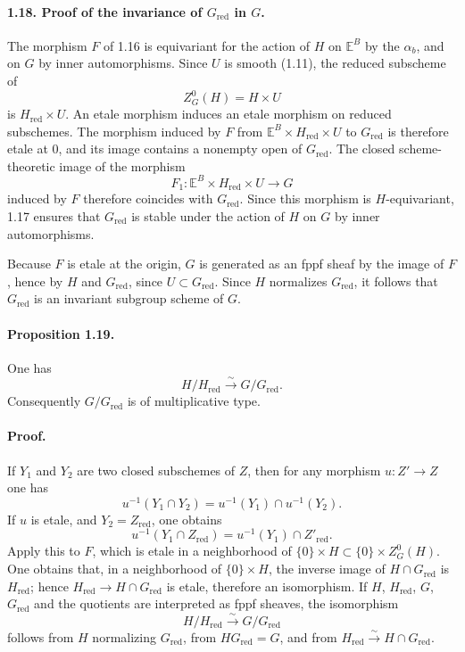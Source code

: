 \documentclass[11pt]{article}
\newcommand{\red}{\mathrm{red}}
\newcommand{\xiso}{\xrightarrow{\sim}}
\theoremstyle{plain}
\theoremstyle{definition}
\begin{document}
\paragraph{1.18. Proof of the invariance of $G_{\red}$ in $G$.} The morphism $F$ of 1.16 is equivariant for the action of $H$ on $\mathbb E^B$ by the $\alpha_b$, and on $G$ by inner automorphisms. Since $U$ is smooth (1.11), the reduced subscheme of
\[
   Z^0_G(H)=H\times U
\]
is $H_{\red}\times U$. An etale morphism induces an etale morphism on reduced subschemes. The morphism induced by $F$ from $\mathbb E^B\times H_{\red}\times U$ to $G_{\red}$ is therefore etale at $0$, and its image contains a nonempty open of $G_{\red}$. The closed scheme-theoretic image of the morphism
\[
   F_1:\mathbb E^B\times H_{\red}\times U\longrightarrow G
\]
induced by $F$ therefore coincides with $G_{\red}$. Since this morphism is $H$-equivariant, 1.17 ensures that $G_{\red}$ is stable under the action of $H$ on $G$ by inner automorphisms.

Because $F$ is etale at the origin, $G$ is generated as an fppf sheaf by the image of $F$, hence by $H$ and $G_{\red}$, since $U\subset G_{\red}$. Since $H$ normalizes $G_{\red}$, it follows that $G_{\red}$ is an invariant subgroup scheme of $G$.

\paragraph{Proposition 1.19.} One has
\[
   H/H_{\red}\xiso{}G/G_{\red}.
\]
Consequently $G/G_{\red}$ is of multiplicative type.

\paragraph{Proof.} If $Y_1$ and $Y_2$ are two closed subschemes of $Z$, then for any morphism $u:Z'\to Z$ one has
\[
   u^{-1}(Y_1\cap Y_2)=u^{-1}(Y_1)\cap u^{-1}(Y_2).
\]
If $u$ is etale, and $Y_2=Z_{\red}$, one obtains
\[
   u^{-1}(Y_1\cap Z_{\red})=u^{-1}(Y_1)\cap Z'_{\red}.
\]
Apply this to $F$, which is etale in a neighborhood of $\{0\}\times H\subset\{0\}\times Z^0_G(H)$. One obtains that, in a neighborhood of $\{0\}\times H$, the inverse image of $H\cap G_{\red}$ is $H_{\red}$; hence $H_{\red}\to H\cap G_{\red}$ is etale, therefore an isomorphism. If $H$, $H_{\red}$, $G$, $G_{\red}$ and the quotients are interpreted as fppf sheaves, the isomorphism
\[
   H/H_{\red}\xiso{}G/G_{\red}
\]
follows from $H$ normalizing $G_{\red}$, from $HG_{\red}=G$, and from $H_{\red}\xiso{}H\cap G_{\red}$.
\end{document}
